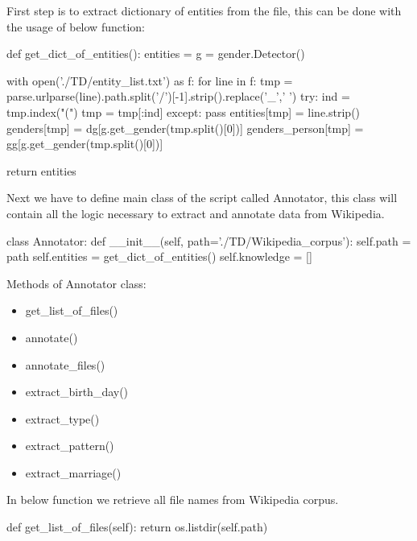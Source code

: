 \documentclass[a4paper]{article}
\begin{document}
First step is to extract dictionary of entities from the file, this can be done with the usage of below function: \\

\begin{python}
def get_dict_of_entities():
    entities = {}
    g = gender.Detector()

    with open('./TD/entity_list.txt') as f:
        for line in f:
           tmp = parse.urlparse(line).path.split('/')[-1].strip().replace('_',' ')
           try:
               ind = tmp.index("(")
               tmp = tmp[:ind]
           except:
               pass
           entities[tmp] = line.strip()
           genders[tmp] = dg[g.get_gender(tmp.split()[0])]
           genders_person[tmp] = gg[g.get_gender(tmp.split()[0])]
   
    return entities
\end{python}

Next we have to define main class of the script called Annotator, this class will contain all the logic necessary to extract and annotate data from Wikipedia.

\begin{python}
class Annotator:
    def __init__(self, path='./TD/Wikipedia_corpus'):
        self.path = path
        self.entities = get_dict_of_entities()
        self.knowledge = []

\end{python}

Methods of Annotator class:
\begin{itemize}
\item get\_list\_of\_files()
\item annotate()
\item annotate\_files()
\item extract\_birth\_day()
\item extract\_type()
\item extract\_pattern()
\item extract\_marriage()
\end{itemize}

In below function we retrieve all file names from Wikipedia corpus.
\begin{python}
    def get_list_of_files(self):
        return os.listdir(self.path)
\end{python}
\end{document}
